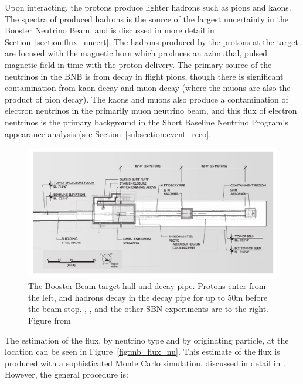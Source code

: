 Upon interacting, the protons produce lighter hadrons such as pions and kaons.  The spectra of produced hadrons is the source of the largest uncertainty in the Booster Neutrino Beam, and is discussed in more detail in Section~\ref{section:flux_uncert}.  The hadrons produced by the protons at the target are focused with the magnetic horn which produces an azimuthal, pulsed magnetic field in time with the proton delivery.  The primary source of the neutrinos in the BNB is from decay in flight pions, though there is significant contamination from kaon decay and muon decay (where the muons are also the product of pion decay).  The kaons and muons also produce a contamination of electron neutrinos in the primarily muon neutrino beam, and this flux of electron neutrinos is the primary background in the Short Baseline Neutrino Program's \nue appearance analysis (see Section~\ref{subsection:event_reco}.

\begin{figure}[tb]
  \centering
  \includegraphics[width=\textwidth]{beams_figures/mb_target_schematic}
  \caption[BNB Target Schematic]{The Booster Beam target hall and decay pipe.  Protons enter from the left, and hadrons decay in the decay pipe for up to 50m before the beam stop.  \MB, \uboone, and the other SBN experiments are to the right. Figure from \cite{AguilarArevalo:2008yp}}
  \label{fig:mb_target_schematic}
\end{figure}

The estimation of the flux, by neutrino type and by originating particle, at the \MB location can be seen in Figure~\ref{fig:mb_flux_nu}.  This estimate of the flux is produced with a sophisticated Monte Carlo simulation, discussed in detail in \cite{AguilarArevalo:2008yp}.  However, the general procedure is:

